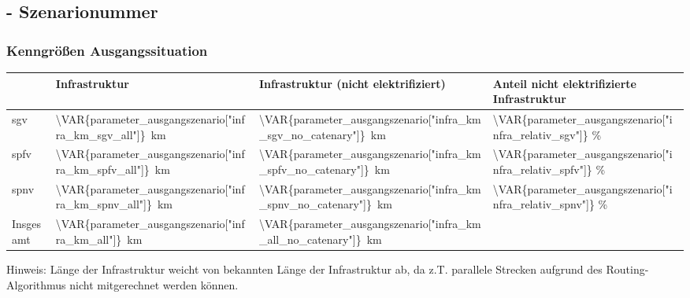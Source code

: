 \subsection{ - Szenarionummer }\label{chap_kenngrößen_s_\VAR{scenario_id}}

\subsubsection{Kenngrößen Ausgangssituation}
\begin{center}
	\begin{tabularx}{\textwidth}{l | X | X | X} & Infrastruktur & Infrastruktur (nicht elektrifiziert) & Anteil nicht elektrifizierte Infrastruktur \\
	\hline
	\acrshort{sgv} & \SI{\VAR{parameter_ausgangszenario["infra_km_sgv_all"]}}{\km} & \SI{\VAR{parameter_ausgangszenario["infra_km_sgv_no_catenary"]}}{\km} & \num{\VAR{parameter_ausgangszenario["infra_relativ_sgv"]}} \% \\
	\acrshort{spfv} & \SI{\VAR{parameter_ausgangszenario["infra_km_spfv_all"]}}{\km} & \SI{\VAR{parameter_ausgangszenario["infra_km_spfv_no_catenary"]}}{\km} & \num{\VAR{parameter_ausgangszenario["infra_relativ_spfv"]}} \% \\
	\acrshort{spnv} & \SI{\VAR{parameter_ausgangszenario["infra_km_spnv_all"]}}{\km} & \SI{\VAR{parameter_ausgangszenario["infra_km_spnv_no_catenary"]}}{\km} & \num{\VAR{parameter_ausgangszenario["infra_relativ_spnv"]}} \% \\
	\hline
	Insgesamt & \SI{\VAR{parameter_ausgangszenario["infra_km_all"]}}{\km} & \SI{\VAR{parameter_ausgangszenario["infra_km_all_no_catenary"]}}{\km} & \\
	\end{tabularx}
\end{center}
\hspace{2em}
Hinweis: Länge der Infrastruktur weicht von bekannten Länge der Infrastruktur ab, da z.T. parallele Strecken aufgrund des Routing-Algorithmus nicht mitgerechnet werden können.

